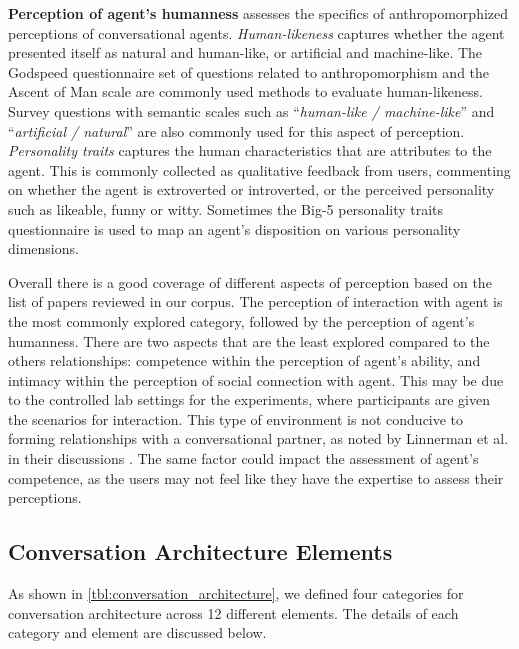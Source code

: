 \textbf{Perception of agent's humanness} assesses the specifics of anthropomorphized perceptions of conversational agents. \textit{Human-likeness} captures whether the agent presented itself as natural and human-like, or artificial and machine-like. The Godspeed questionnaire \cite{bartneck2009measurement} set of questions related to anthropomorphism and the Ascent of Man scale \cite{kteily2015ascent} are commonly used methods to evaluate human-likeness. Survey questions with semantic scales such as ``\textit{human-like / machine-like}'' and ``\textit{artificial / natural}'' are also commonly used for this aspect of perception. \textit{Personality traits} captures the human characteristics that are attributes to the agent. This is commonly collected as qualitative feedback from users, commenting on whether the agent is extroverted or introverted, or the perceived personality such as likeable, funny or witty. Sometimes the Big-5 personality traits questionnaire \cite{gosling2003very} is used to map an agent's disposition on various personality dimensions.

Overall there is a good coverage of different aspects of perception based on the list of papers reviewed in our corpus. The perception of interaction with agent is the most commonly explored category, followed by the perception of agent's humanness. There are two aspects that are the least explored compared to the others relationships: competence within the perception of agent's ability, and intimacy within the perception of social connection with agent. This may be due to the controlled lab settings for the experiments, where participants are given the scenarios for interaction. This type of environment is not conducive to forming relationships with a conversational partner, as noted by Linnerman et al. in their discussions \cite{linnemann2018can}\cmt{[15]}. The same factor could impact the assessment of agent's competence, as the users may not feel like they have the expertise to assess their perceptions. 




\subsection{Conversation Architecture Elements}

As shown in \autoref{tbl:conversation_architecture}, we defined four categories for conversation architecture across 12 different elements. The details of each category and element are discussed below.


